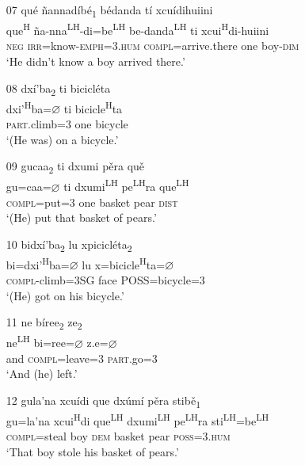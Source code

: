 \begin{itemize}
\item[07]
\glll qu\'{e} \~{n}annad\'{i}b\'{e}\textsubscript{1} b\'{e}danda t\'{i} xcu\'{i}dihuiini \\
que\textsuperscript{H} \~{n}a-nna\textsuperscript{LH}-di=be\textsuperscript{LH}  be-danda\textsuperscript{LH} ti xcui\textsuperscript{H}di-huiini \\
\textsc{neg} \textsc{irr}=know-\textsc{emph}=\textsc{3.hum} \textsc{compl}=arrive.there one boy-\textsc{dim} \\
\glt `He didn't know a boy arrived there.'
 

\item[08]
\glll dx\'{i}'ba\textsubscript{2} ti bicicl\'{e}ta  \\
dxi'\textsuperscript{H}ba={$\varnothing$} ti bicicle\textsuperscript{H}ta  \\
\textsc{part}.climb=\textsc{3} one bicycle  \\
\glt `(He was) on a bicycle.'


\item[09]
\glll gucaa\textsubscript{2} ti dxumi p\v{e}ra qu\v{e} \\
gu=caa={$\varnothing$} ti dxumi\textsuperscript{LH} pe\textsuperscript{LH}ra que\textsuperscript{LH} \\
\textsc{compl}=put=\textsc{3} one basket pear \textsc{dist} \\
\glt `(He) put that basket of pears.'


\item[10]
\glll bidx\'{i}'ba\textsubscript{2} lu xpicicl\'{e}ta\textsubscript{2} \\
bi=dxi'\textsuperscript{H}ba={$\varnothing$} lu x=bicicle\textsuperscript{H}ta={$\varnothing$}  \\
\textsc{compl}-climb=3SG face POSS=bicycle=\textsc{3} \\
\glt `(He) got on his bicycle.'

 
 \item[11]
\glll ne b\'{i}ree\textsubscript{2} ze\textsubscript{2} \\
ne\textsuperscript{LH} bi=ree={$\varnothing$} z.e={$\varnothing$} \\
and \textsc{compl}=leave=\textsc{3} \textsc{part}.go=\textsc{3} \\
\glt `And (he) left.'


\item[12]
\glll gula'na xcu\'{i}di que dx\'{u}m\'{i} p\v{e}ra stib\v{e}\textsubscript{1} \\
gu=la'na xcui\textsuperscript{H}di que\textsuperscript{LH} dxumi\textsuperscript{LH} pe\textsuperscript{LH}ra sti\textsuperscript{LH}=be\textsuperscript{LH}  \\
\textsc{compl}=steal boy \textsc{dem} basket pear \textsc{poss}=\textsc{3.hum} \\
\glt `That boy stole his basket of pears.'



\end{itemize}
